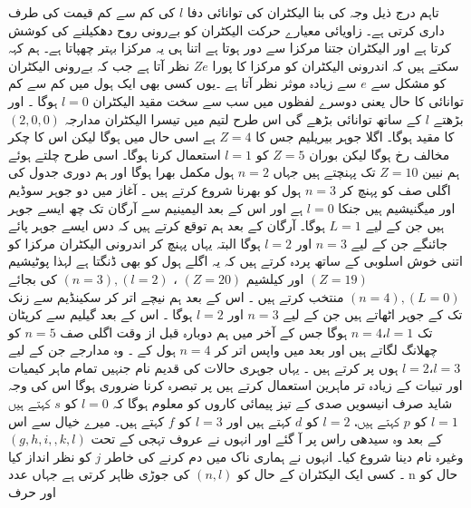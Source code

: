 تاہم درج ذیل وجہ کی بنا الیکٹران کی توانائی دفا
 \(l\) 
کی کم سے کم قیمت کی طرف داری کرتی ہے۔  زاویائی معیارے حرکت الیکٹران کو بےرونی روح دھکیلنے کی کوشش کرتا ہے اور الیکٹران جتنا مرکزا سے دور ہوتا ہے اتنا ہی یہ مرکزا بہتر چھپاتا ہے۔ ہم کہہ سکتے ہیں کہ اندرونی الیکٹران کو مرکزا کا پورا 
\(Ze\)
نظر آتا ہے جب کہ بےرونی الیکٹران کو مشکل سے 
\(e\)
 سے زیادہ موثر  نظر آتا ہے ۔یوں کسی بھی ایک ہول میں کم سے کم توانائی کا حال یعنی دوسرے لفظوں میں سب سے سخت مقید الیکٹران
 \( l=0\) 
 ہوگا ۔ اور بڑھتے
  \(l\) 
 کے ساتھ توانائی بڑھے گی اس طرح لتیم میں تیسرا الیکٹران مدارجہ
  \((2,0,0)\)
 کا مقید ہوگا۔ اگلا جوہر بیریلیم جس کا
  \(Z=4\) 
 ہے اسی حال میں ہوگا لیکن اس کا چکر مخالف رخ ہوگا لیکن بوران
  \(Z=5\) 
 کو
 \( l=1\) 
 استعمال کرنا ہوگا۔ 
 اسی طرح چلتے ہوئے ہم  نیین
 \( Z=10\) 
 تک پہنچتے ہیں جہاں
  \(n=2\) 
 ہول مکمل بھرا ہوگا اور ہم دوری جدول کی اگلی صف کو پہنچ کر
  \(n= 3\) 
 ہول کو بھرنا شروع کرتے ہیں ۔ آغاز میں دو جوہر سوڈیم اور میگنیشیم ہیں جنکا
 \( l=0\) 
 ہے اور اس کے بعد الیمینیم سے آرگان تک چھ ایسے جوہر ہیں جن کے لیے 
 \(L=1\)
  ہوگا۔ آرگان کے بعد ہم توقع کرتے ہیں کہ دس ایسے جوہر پائے جائنگے جن کے لیے 
  \(n=3\) 
  اور 
  \(l=2\) 
  ہوگا البتہ یہاں پہنچ کر اندرونی الیکٹران مرکزا کو اتنی خوش اسلوبی کے ساتھ پردہ کرتے ہیں کہ یہ اگلے ہول کو بھی ڈنگتا ہے لہذا پوٹیشیم
\(( Z=19)\) 
  اور کیلشیم
  \((Z=20)\)
  ،
  \((n=3),(l=2)\)
 کی بجائے
 \( (n=4),( L=0 )\)
 منتخب کرتے ہیں  ۔ اس کے بعد ہم نیچے اتر کر سکینڈیم سے زنک تک کے جوہر اٹھاتے ہیں جن کے لیے
 \( n=3\)
  اور
\( l=2\)
   ہوگا ۔ اس کے بعد گیلیم سے کرپٹان تک
\( n=4، l=1\)
    ہوگا جس کے آخر میں ہم دوبارہ قبل از وقت اگلی صف
\( n=5\) 
    کو چھلانگ لگاتے ہیں اور بعد میں واپس اتر کر
\( n= 4\)  
    ہول کے ۔ وہ مدارجے جن کے لیے
\( l=2، l=3\) 
    ہوں پر کرتے ہیں ۔ یہاں جوہری حالات کی قدیم نام جنہیں تمام ماہر کیمیات اور تبیات کے زیادہ تر ماہرین استعمال کرتے ہیں پر تبصرہ کرنا ضروری ہوگا اس کی وجہ شاید صرف انیسویں صدی کے تیز پیمائی کاروں کو معلوم ہوگا کہ
 \(l=0\) 
    کو
  \(s\)
      کہتے ہیں 
 \(l=1\)
       کو 
 \(p\)
        کہتے ہیں،
\( l=2\) 
        کو
   \(d\)
          کہتے ہیں اور
   \(l=3\)
            کو
\( f\)
  کہتے ہیں۔ میرے خیال سے اس کے بعد وہ سیدھی راس پر آ گئے اور انہوں نے عروف تہجی کے تحت
\( (g,h,i,,k,l)\)
   وغیرہ نام دینا شروع کیا۔ انہوں نے ہماری ناک میں دم کرنے کی خاطر 
  \(j\)
    کو نظر انداز کیا ۔ کسی ایک الیکٹران کے حال کو
    \( (n,l)\) 
    کی جوڑی ظاہر کرتی ہے جہاں عدد n حال کو اور حرف
